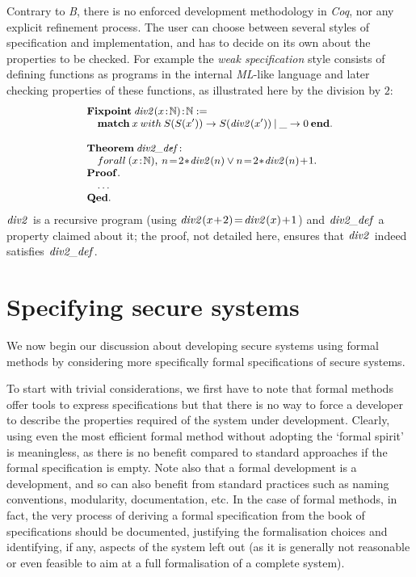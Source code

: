 \documentclass[conference]{IEEEtran}
\begin{document}
Contrary to \emph{B}, there is no enforced development methodology in \emph{Coq}, nor any
explicit refinement process. The user can choose between several styles of specification and
implementation, and has to decide on its own about the properties to be checked. For example
the \emph{weak specification} style consists of defining functions as programs in the
internal \emph{ML}-like language and later checking properties of these functions, as
illustrated here by the division by {\small$2$}:
\[\small\begin{array}{l}
\Cmd{Fixpoint}\:\fid{div2}(x\!:\!\NAT)\!:\!\NAT:=\\
\quad\Cmd{match}\:x\:with\:S(S(x')) \to S(\fid{div2}(x'))\:|\:\_ \to 0\:\Cmd{end}.\\\\
\Cmd{Theorem}\:\fid{div2\_def}\!:\\
\quad forall\:(x\!:\!\NAT),\:n\!=\!2\!*\!\fid{div2}(n)\lor n\!=\!2\!*\!\fid{div2}(n)\!+\!1.\\
\Cmd{Proof.}\\
\quad\ldots\\
\Cmd{Qed.}
\end{array}\]
{\small$\textrm{\emph{div2}}$} is a recursive program (using
{\small$\textrm{\emph{div2}}(x\!+\!2)\!=\!\textrm{\emph{div2}}(x)\!+\!1$}) and
{\small$\textrm{\emph{div2\_def}}$} a property claimed about it; the proof, not detailed here,
ensures that {\small$\textrm{\emph{div2}}$} indeed satisfies {\small$\textrm{\emph{div2\_def}}$}.

\section{Specifying secure systems}\label{spec_security}

We now begin our discussion about developing secure systems using formal methods by
considering more specifically formal specifications of secure systems.

To start with trivial considerations, we first have to note that formal methods offer tools to
express specifications but that there is no way to force a developer to describe the
properties required of the system under development. Clearly, using even the most efficient
formal method without adopting the `formal spirit' is meaningless, as there is no benefit
compared to standard approaches if the formal specification is empty. Note also that a formal
development is a development, and so can also benefit from standard practices such as naming
conventions, modularity, documentation, etc. In the case of formal methods, in fact, the very
process of deriving a formal specification from the book of specifications should be
documented, justifying the formalisation choices and identifying, if any, aspects of the
system left out (as it is generally not reasonable or even feasible to aim at a full
formalisation of a complete system).
\end{document}
